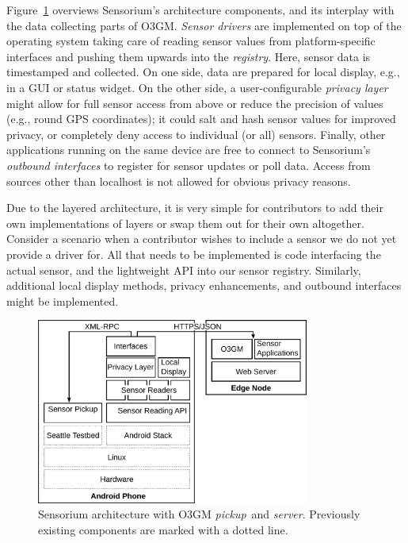 Figure~\ref{c5:fig:architecture} overviews Sensorium's architecture components, and its interplay with the data collecting parts of \gls{O3GM}. \textit{Sensor drivers} are implemented on top of the operating system taking care of reading sensor values from platform-specific interfaces and pushing them upwards into the \textit{registry}. Here, sensor data is timestamped and collected. On one side, data are prepared for local display, e.g., in a \gls{GUI} or status widget. On the other side, a user-configurable \textit{privacy layer} might allow for full sensor access from above or reduce the precision of values (e.g., round \gls{GPS} coordinates); it could salt and hash sensor values for improved privacy, or completely deny access to individual (or all) sensors. Finally, other applications running on the same device are free to connect to Sensorium's \textit{outbound interfaces} to register for sensor updates or poll data. Access from sources other than localhost is not allowed for obvious privacy reasons.

Due to the layered architecture, it is very simple for contributors to add their own implementations of layers or swap them out for their own altogether. Consider a scenario when a contributor wishes to include a sensor we do not yet provide a driver for. All that needs to be implemented is code interfacing the actual sensor, and the lightweight \gls{API} into our sensor registry. Similarly, additional local display methods, privacy enhancements, and outbound interfaces might be implemented.

\begin{figure}[htb]
	\centering
	\includegraphics[width=0.8\textwidth]{images/sensorium-arch.pdf}
	\caption{Sensorium architecture with \gls{O3GM} \textit{pickup}~and \textit{server}. Previously existing components are marked with a dotted line.}
\label{c5:fig:architecture}
\end{figure}

